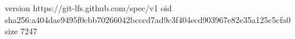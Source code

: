 version https://git-lfs.github.com/spec/v1
oid sha256:a404dae9495f0cbb70266042bcccd7ad9c3f404ecd903967e82e35a125c5cfa0
size 7247
